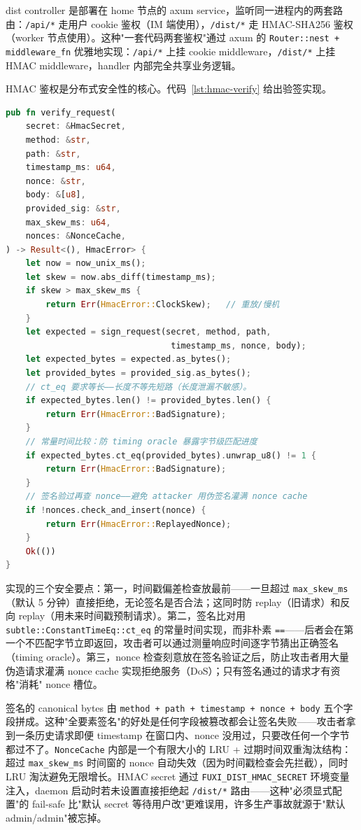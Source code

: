 dist controller 是部署在 home 节点的 axum service，监听同一进程内的两套路由：\texttt{/api/*} 走用户 cookie 鉴权（IM 端使用），\texttt{/dist/*} 走 HMAC-SHA256 鉴权（worker 节点使用）。这种"一套代码两套鉴权"通过 axum 的 \texttt{Router::nest + middleware\_fn} 优雅地实现：\texttt{/api/*} 上挂 cookie middleware，\texttt{/dist/*} 上挂 HMAC middleware，handler 内部完全共享业务逻辑。

HMAC 鉴权是分布式安全性的核心。代码~\ref{lst:hmac-verify} 给出验签实现。

\begin{lstlisting}[language=Rust, caption={HMAC-SHA256 验签实现（fuxi-cli/src/dist\_auth.rs）}, label={lst:hmac-verify}]
pub fn verify_request(
    secret: &HmacSecret,
    method: &str,
    path: &str,
    timestamp_ms: u64,
    nonce: &str,
    body: &[u8],
    provided_sig: &str,
    max_skew_ms: u64,
    nonces: &NonceCache,
) -> Result<(), HmacError> {
    let now = now_unix_ms();
    let skew = now.abs_diff(timestamp_ms);
    if skew > max_skew_ms {
        return Err(HmacError::ClockSkew);   // 重放/慢机
    }
    let expected = sign_request(secret, method, path,
                                 timestamp_ms, nonce, body);
    let expected_bytes = expected.as_bytes();
    let provided_bytes = provided_sig.as_bytes();
    // ct_eq 要求等长——长度不等先短路（长度泄漏不敏感）。
    if expected_bytes.len() != provided_bytes.len() {
        return Err(HmacError::BadSignature);
    }
    // 常量时间比较：防 timing oracle 暴露字节级匹配进度
    if expected_bytes.ct_eq(provided_bytes).unwrap_u8() != 1 {
        return Err(HmacError::BadSignature);
    }
    // 签名验过再查 nonce——避免 attacker 用伪签名灌满 nonce cache
    if !nonces.check_and_insert(nonce) {
        return Err(HmacError::ReplayedNonce);
    }
    Ok(())
}
\end{lstlisting}

实现的三个安全要点：第一，时间戳偏差检查放最前——一旦超过 \texttt{max\_skew\_ms}（默认 5 分钟）直接拒绝，无论签名是否合法；这同时防 replay（旧请求）和反向 replay（用未来时间戳预制请求）。第二，签名比对用 \texttt{subtle::ConstantTimeEq::ct\_eq} 的常量时间实现，而非朴素 \texttt{==}——后者会在第一个不匹配字节立即返回，攻击者可以通过测量响应时间逐字节猜出正确签名（timing oracle）。第三，nonce 检查刻意放在签名验证之后，防止攻击者用大量伪造请求灌满 nonce cache 实现拒绝服务（DoS）；只有签名通过的请求才有资格"消耗" nonce 槽位。

签名的 canonical bytes 由 \texttt{method + path + timestamp + nonce + body} 五个字段拼成。这种"全要素签名"的好处是任何字段被篡改都会让签名失败——攻击者拿到一条历史请求即便 timestamp 在窗口内、nonce 没用过，只要改任何一个字节都过不了。\texttt{NonceCache} 内部是一个有限大小的 LRU + 过期时间双重淘汰结构：超过 \texttt{max\_skew\_ms} 时间窗的 nonce 自动失效（因为时间戳检查会先拦截），同时 LRU 淘汰避免无限增长。HMAC secret 通过 \texttt{FUXI\_DIST\_HMAC\_SECRET} 环境变量注入，daemon 启动时若未设置直接拒绝起 \texttt{/dist/*} 路由——这种"必须显式配置"的 fail-safe 比"默认 secret 等待用户改"更难误用，许多生产事故就源于"默认 admin/admin"被忘掉。

